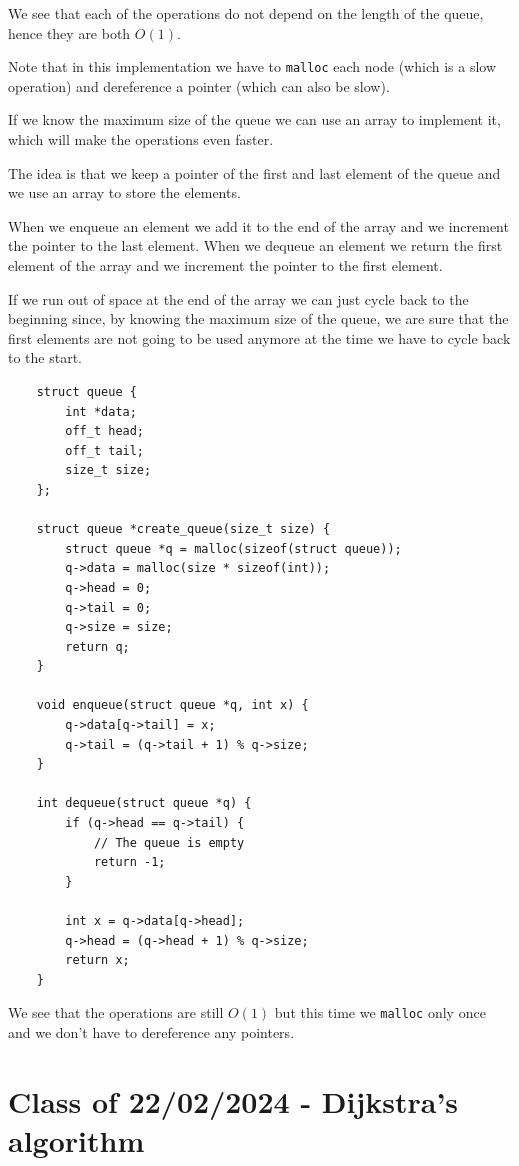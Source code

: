\documentclass[10pt]{extarticle}
\begin{document}
We see that each of the operations do not depend on the length of the queue, hence they are both $O(1)$.

Note that in this implementation we have to \texttt{malloc} each node (which is a slow operation) and dereference a pointer (which can also be slow).

If we know the maximum size of the queue we can use an array to implement it, which will make the operations even faster.

The idea is that we keep a pointer of the first and last element of the queue and we use an array to store the elements.

When we enqueue an element we add it to the end of the array and we increment the pointer to the last element.
When we dequeue an element we return the first element of the array and we increment the pointer to the first element.

If we run out of space at the end of the array we can just cycle back to the beginning since, by knowing the maximum size of the queue, we are sure that the first elements are not going to be used anymore at the time we have to cycle back to the start.

\begin{verbatim}
    struct queue {
        int *data;
        off_t head;
        off_t tail;
        size_t size;
    };

    struct queue *create_queue(size_t size) {
        struct queue *q = malloc(sizeof(struct queue));
        q->data = malloc(size * sizeof(int));
        q->head = 0;
        q->tail = 0;
        q->size = size;
        return q;
    }

    void enqueue(struct queue *q, int x) {
        q->data[q->tail] = x;
        q->tail = (q->tail + 1) % q->size;
    }

    int dequeue(struct queue *q) {
        if (q->head == q->tail) {
            // The queue is empty
            return -1;
        }

        int x = q->data[q->head];
        q->head = (q->head + 1) % q->size;
        return x;
    }
\end{verbatim}

We see that the operations are still $O(1)$ but this time we \texttt{malloc} only once and we don't have to dereference any pointers.

\section{Class of 22/02/2024 - Dijkstra's algorithm}
\end{document}
